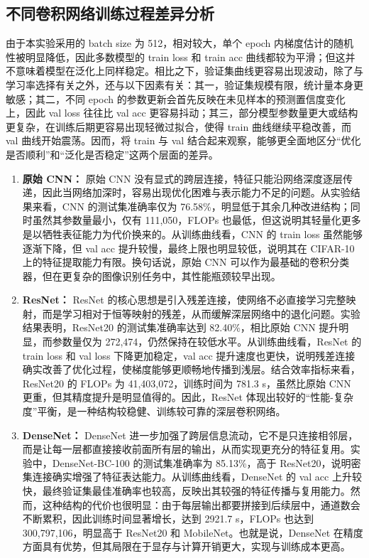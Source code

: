 \documentclass[a4paper]{article}
\begin{document}
\subsection{不同卷积网络训练过程差异分析}
由于本实验采用的 batch size 为 512，相对较大，单个 epoch 内梯度估计的随机性被明显降低，因此多数模型的 train loss 和 train acc 曲线都较为平滑；但这并不意味着模型在泛化上同样稳定。相比之下，验证集曲线更容易出现波动，除了与学习率选择有关之外，还与以下因素有关：其一，验证集规模有限，统计量本身更敏感；其二，不同 epoch 的参数更新会首先反映在未见样本的预测置信度变化上，因此 val loss 往往比 val acc 更容易抖动；其三，部分模型参数量更大或结构更复杂，在训练后期更容易出现轻微过拟合，使得 train 曲线继续平稳改善，而 val 曲线开始震荡。因而，将 train 与 val 结合起来观察，能够更全面地区分“优化是否顺利”和“泛化是否稳定”这两个层面的差异。
\begin{enumerate}
    \item \textbf{原始 CNN：}
    原始 CNN 没有显式的跨层连接，特征只能沿网络深度逐层传递，因此当网络加深时，容易出现优化困难与表示能力不足的问题。从实验结果来看，CNN 的测试集准确率仅为 76.58\%，明显低于其余几种改进结构；同时虽然其参数量最小，仅有 111,050，FLOPs 也最低，但这说明其轻量化更多是以牺牲表征能力为代价换来的。从训练曲线看，CNN 的 train loss 虽然能够逐渐下降，但 val acc 提升较慢，最终上限也明显较低，说明其在 CIFAR-10 上的特征提取能力有限。换句话说，原始 CNN 可以作为最基础的卷积分类器，但在更复杂的图像识别任务中，其性能瓶颈较早出现。

    \item \textbf{ResNet：}
    ResNet 的核心思想是引入残差连接，使网络不必直接学习完整映射，而是学习相对于恒等映射的残差，从而缓解深层网络中的退化问题\cite{resnet}。实验结果表明，ResNet20 的测试集准确率达到 82.40\%，相比原始 CNN 提升明显，而参数量仅为 272,474，仍然保持在较低水平。从训练曲线看，ResNet 的 train loss 和 val loss 下降更加稳定，val acc 提升速度也更快，说明残差连接确实改善了优化过程，使梯度能够更顺畅地传播到浅层。结合效率指标来看，ResNet20 的 FLOPs 为 41,403,072，训练时间为 781.3 s，虽然比原始 CNN 更重，但其精度提升是明显值得的。因此，ResNet 体现出较好的“性能-复杂度”平衡，是一种结构较稳健、训练较可靠的深层卷积网络。

    \item \textbf{DenseNet：}
    DenseNet 进一步加强了跨层信息流动，它不是只连接相邻层，而是让每一层都直接接收前面所有层的输出，从而实现更充分的特征复用\cite{densenet}。实验中，DenseNet-BC-100 的测试集准确率为 85.13\%，高于 ResNet20，说明密集连接确实增强了特征表达能力。从训练曲线看，DenseNet 的 val acc 上升较快，最终验证集最佳准确率也较高，反映出其较强的特征传播与复用能力。然而，这种结构的代价也很明显：由于每层输出都要拼接到后续层中，通道数会不断累积，因此训练时间显著增长，达到 2921.7 s，FLOPs 也达到 300,797,106，明显高于 ResNet20 和 MobileNet。也就是说，DenseNet 在精度方面具有优势，但其局限在于显存与计算开销更大，实现与训练成本更高。


\end{enumerate}
\end{document}
